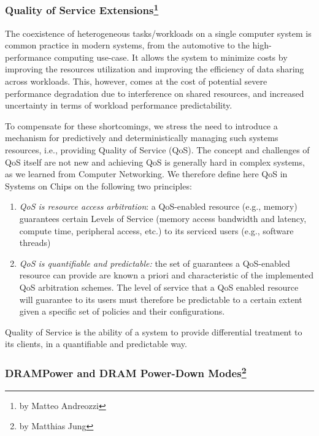 \subsubsection[Quality of Service Extensions]{Quality of Service Extensions\footnote{by Matteo Andreozzi}}

The coexistence of heterogeneous tasks/workloads on a single computer system is common practice in modern systems, from the automotive to the high-performance computing use-case.
It allows the system to minimize costs by improving the resources utilization and improving the efficiency of data sharing across workloads.
This, however, comes at the cost of potential severe performance degradation due to interference on shared resources, and increased uncertainty in terms of workload performance predictability.

To compensate for these shortcomings, we stress the need to introduce a mechanism for predictively and deterministically managing such systems resources, i.e., providing Quality of Service (QoS).
The concept and challenges of QoS itself are not new and achieving QoS is generally hard in complex systems, as we learned from Computer Networking.
We therefore define here QoS in Systems on Chips on the following two principles:
\begin{enumerate}
    \item \emph{QoS is resource access arbitration}: a QoS-enabled resource (e.g., memory) guarantees certain Levels of Service (memory access bandwidth and latency, compute time, peripheral access, etc.) to its serviced users (e.g., software threads)
    \item \emph{QoS is quantifiable and predictable:} the set of guarantees a QoS-enabled resource can provide are known a priori and characteristic of the implemented QoS arbitration schemes.
    The level of service that a QoS enabled resource will guarantee to its users must therefore be predictable to a certain extent given a specific set of policies and their configurations.
\end{enumerate}

Quality of Service is the ability of a system to provide differential treatment to its clients, in a quantifiable and predictable way.

\subsubsection[DRAMPower and DRAM Power-Down Modes]{DRAMPower and DRAM Power-Down Modes\footnote{by Matthias Jung}}

